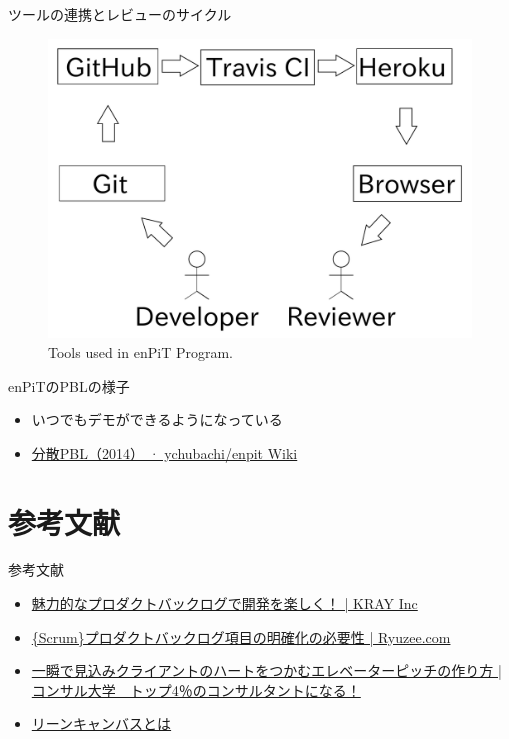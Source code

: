 \documentclass[t]{beamer}
\begin{document}
\begin{frame}[label=sec-4-2]{ツールの連携とレビューのサイクル}
\begin{figure}[htb]
\centering
\includegraphics[width=.75\linewidth]{./tools.pdf}
\caption{\label{fig:tools}Tools used in enPiT Program.}
\end{figure}
\end{frame}

\begin{frame}[label=sec-4-3]{enPiTのPBLの様子}
\begin{itemize}
\item いつでもデモができるようになっている
\item \href{https://github.com/ychubachi/enpit/wiki/\%E5\%88\%86\%E6\%95\%A3PBL\%EF\%BC\%882014\%EF\%BC\%89}{分散PBL（2014） · ychubachi/enpit Wiki}
\end{itemize}
\end{frame}

\section{参考文献}
\label{sec-5}
\begin{frame}[label=sec-5-1]{参考文献}
\begin{itemize}
\item \href{http://kray.jp/blog/attractive-product-backlog/}{魅力的なプロダクトバックログで開発を楽しく！ | KRAY Inc}
\item \href{http://www.ryuzee.com/contents/blog/5024}{\{Scrum\}プロダクトバックログ項目の明確化の必要性 | Ryuzee.com}
\item \href{http://master-consultant.jp/\%E3\%82\%A8\%E3\%83\%AC\%E3\%83\%99\%E3\%83\%BC\%E3\%82\%BF\%E3\%83\%BC\%E3\%83\%94\%E3\%83\%83\%E3\%83\%81\%E3\%81\%AE\%E4\%BD\%9C\%E3\%82\%8A\%E6\%96\%B9/}{一瞬で見込みクライアントのハートをつかむエレベーターピッチの作り方 | コンサル大学　トップ4％のコンサルタントになる！}
\item \href{http://www.slideshare.net/studytech/ss-23454300}{リーンキャンバスとは}
\end{itemize}
\end{frame}
\end{document}
